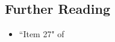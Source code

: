\subsection[Further Reading]{Further Reading}\label{further-reading}

\begin{itemize}
\item{``Item 27" of \cite{meyers15b}}
\end{itemize}

